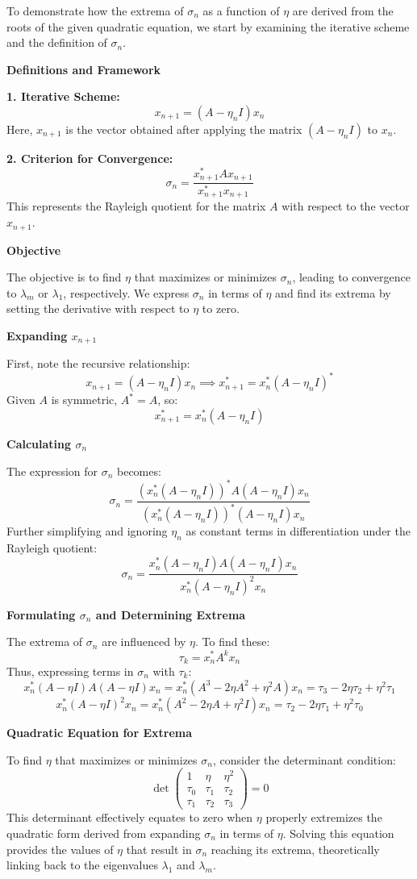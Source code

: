 \documentclass[8pt]{article}
\begin{document}
To demonstrate how the extrema of \(\sigma_n\) as a function of \(\eta\) are derived from the roots of the given quadratic equation, we start by examining the iterative scheme and the definition of \(\sigma_n\).

\textbf{Definitions and Framework}

\textbf{1. Iterative Scheme:}
   \[
   x_{n+1} = (A - \eta_n I)x_n
   \]
   Here, \(x_{n+1}\) is the vector obtained after applying the matrix \((A - \eta_n I)\) to \(x_n\).

\textbf{2. Criterion for Convergence:}
   \[
   \sigma_n = \frac{x_{n+1}^* A x_{n+1}}{x_{n+1}^* x_{n+1}}
   \]
   This represents the Rayleigh quotient for the matrix \(A\) with respect to the vector \(x_{n+1}\).

\textbf{Objective}

The objective is to find \(\eta\) that maximizes or minimizes \(\sigma_n\), leading to convergence to \(\lambda_m\) or \(\lambda_1\), respectively. We express \(\sigma_n\) in terms of \(\eta\) and find its extrema by setting the derivative with respect to \(\eta\) to zero.

\textbf{Expanding \(x_{n+1}\)}

First, note the recursive relationship:
\[
x_{n+1} = (A - \eta_n I)x_n \implies x_{n+1}^* = x_n^* (A - \eta_n I)^*
\]
Given \(A\) is symmetric, \(A^* = A\), so:
\[
x_{n+1}^* = x_n^* (A - \eta_n I)
\]

\textbf{Calculating \(\sigma_n\)}

The expression for \(\sigma_n\) becomes:
\[
\sigma_n = \frac{(x_n^* (A - \eta_n I))^* A (A - \eta_n I) x_n}{(x_n^* (A - \eta_n I))^* (A - \eta_n I) x_n}
\]
Further simplifying and ignoring \(\eta_n\) as constant terms in differentiation under the Rayleigh quotient:
\[
\sigma_n = \frac{x_n^* (A - \eta_n I) A (A - \eta_n I) x_n}{x_n^* (A - \eta_n I)^2 x_n}
\]

\textbf{Formulating \(\sigma_n\) and Determining Extrema}

The extrema of \(\sigma_n\) are influenced by \(\eta\). To find these:
\[
\tau_k = x_n^* A^k x_n
\]
Thus, expressing terms in \(\sigma_n\) with \(\tau_k\):
\[
x_n^* (A - \eta I) A (A - \eta I) x_n = x_n^* (A^3 - 2\eta A^2 + \eta^2 A) x_n = \tau_3 - 2\eta \tau_2 + \eta^2 \tau_1
\]
\[
x_n^* (A - \eta I)^2 x_n = x_n^* (A^2 - 2\eta A + \eta^2 I) x_n = \tau_2 - 2\eta \tau_1 + \eta^2 \tau_0
\]

\textbf{Quadratic Equation for Extrema}

To find \(\eta\) that maximizes or minimizes \(\sigma_n\), consider the determinant condition:
\[
\det \begin{pmatrix}
1 & \eta & \eta^2 \\
\tau_0 & \tau_1 & \tau_2 \\
\tau_1 & \tau_2 & \tau_3
\end{pmatrix} = 0
\]
This determinant effectively equates to zero when \(\eta\) properly extremizes the quadratic form derived from expanding \(\sigma_n\) in terms of \(\eta\). Solving this equation provides the values of \(\eta\) that result in \(\sigma_n\) reaching its extrema, theoretically linking back to the eigenvalues \(\lambda_1\) and \(\lambda_m\).
\end{document}

